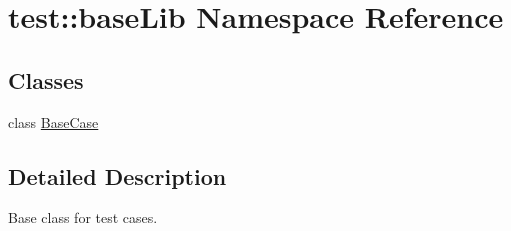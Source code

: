 \hypertarget{namespacetest_1_1baseLib}{\section{test\-:\-:base\-Lib \-Namespace \-Reference}
\label{df/d55/namespacetest_1_1baseLib}
}
\subsection*{\-Classes}
\begin{DoxyCompactItemize}
\item 
class \hyperlink{classtest_1_1baseLib_1_1BaseCase}{\-Base\-Case}
\end{DoxyCompactItemize}


\subsection{\-Detailed \-Description}
\begin{DoxyVerb}
Base class for test cases.
\end{DoxyVerb}
 